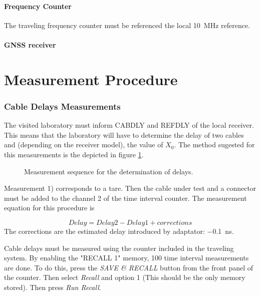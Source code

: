 \documentclass[11pt]{article}
\begin{document}
\subsection{Frequency Counter}
The traveling frequency counter must be referenced the local \SI{10}{\mega\hertz} reference.



\subsection{GNSS receiver}






\part{Measurement Procedure }

\section{Cable Delays Measurements}

The visited laboratory must inform CABDLY and REFDLY of the local receiver. This means that the laboratory will have to determine the delay of two cables and (depending on the receiver model), the value of $X_0$.
The method sugested for this measurements is the depicted in figure \ref{fig:DUTdelaymeasurement}.


\begin{figure}[ht]
\begin{center}

\caption{Measurement sequence for the determination of delays.} \label{fig:DUTdelaymeasurement}
\end{center}
\end{figure}

Measurement 1) corresponds to a tare. Then the cable under test and a connector must be added to the channel 2 of the time interval counter. The measurement equation for this procedure is 

\begin{equation}
Delay = Delay2 - Delay1 + corrections
\end{equation}
The corrections are the estimated delay introduced by adaptator: \SI{-0.1}{\nano\second}. 


Cable delays must be measured using the counter included in the traveling system. By enabling the "RECALL 1" memory, 100 time interval measurements are done. To do this, press the \textit{SAVE \& RECALL} button from the front panel of the counter. Then select \textit{Recall} and option 1 (This should be the only memory stored). Then press \textit{Run Recall}.
\end{document}
